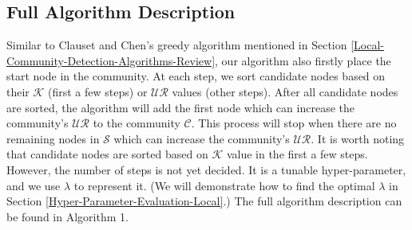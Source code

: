 \documentclass[\main/thesis.tex]{subfiles}
\begin{document}
\subsection{Full Algorithm Description} \label{Full-Algorithm-Description-local}
Similar to Clauset and Chen's greedy algorithm mentioned in Section \ref{Local-Community-Detection-Algorithms-Review}, our algorithm also firstly place the start node in the community. At each step, we sort candidate nodes based on their $\mathcal{K}$ (first a few steps) or $\mathcal{UR}$ values (other steps). After all candidate nodes are sorted, the algorithm will add the first node which can increase the community's $\mathcal{UR}$ to the community $\mathcal{C}$. This process will stop when there are no remaining nodes in $\mathcal{S}$ which can increase the community's $\mathcal{UR}$. It is worth noting that candidate nodes are sorted based on $\mathcal{K}$ value in the first a few steps. However, the number of steps is not yet decided. It is a tunable hyper-parameter, and we use $\lambda$ to represent it. (We will demonstrate how to find the optimal $\lambda$ in Section \ref{Hyper-Parameter-Evaluation-Local}.) The full algorithm description can be found in Algorithm 1.
\end{document}
